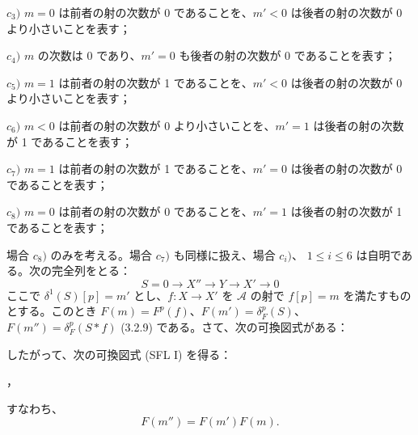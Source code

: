 \clearpage
{}%
\begingroup\small\setlength{\parskip}{0pt}\setlength{\emergencystretch}{1.5em}
\setlength{\abovedisplayskip}{4pt plus 2pt minus 2pt}%
\setlength{\belowdisplayskip}{4pt plus 2pt minus 2pt}%

\noindent$c_3)$ $m=0$ は前者の射の次数が 0 であることを、$m'<0$ は後者の射の次数が 0 より小さいことを表す；

\noindent$c_4)$ $m$ の次数は 0 であり、$m'=0$ も後者の射の次数が 0 であることを表す；

\noindent$c_5)$ $m=1$ は前者の射の次数が 1 であることを、$m'<0$ は後者の射の次数が 0 より小さいことを表す；

\noindent$c_6)$ $m<0$ は前者の射の次数が 0 より小さいことを、$m'=1$ は後者の射の次数が 1 であることを表す；

\noindent$c_7)$ $m=1$ は前者の射の次数が 1 であることを、$m'=0$ は後者の射の次数が 0 であることを表す；

\noindent$c_8)$ $m=0$ は前者の射の次数が 0 であることを、$m'=1$ は後者の射の次数が 1 であることを表す；

場合 $c_8)$ のみを考える。場合 $c_7)$ も同様に扱え、場合 $c_i)$、
$1\leq i\leq 6$ は自明である。次の完全列をとる：
\[
S=0\longrightarrow X''\longrightarrow Y\longrightarrow X'\longrightarrow0
\]
ここで $\delta^1(S)[p]=m'$ とし、$f\colon X\longrightarrow X'$ を
$\mathcal A$ の射で $f[p]=m$ を満たすものとする。このとき
$F(m)=F^p(f)$、$F(m')=\delta_F^p(S)$、
$F(m'')=\delta_F^p(S*f)$ (3.2.9) である。さて、次の可換図式がある：

\begin{center}
\end{center}
したがって、次の可換図式 (SFL I) を得る：

\begin{center}
\hspace{1em}，
\end{center}
すなわち、
\[
F(m'')=F(m')F(m).
\]

